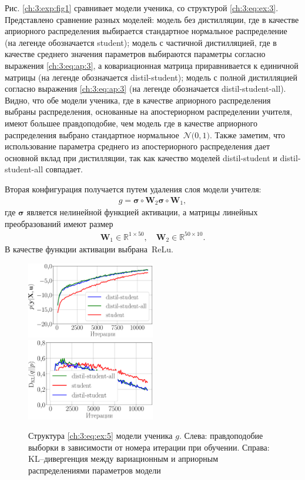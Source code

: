Рис. \ref{ch:3:exp:fig1} сравнивает модели ученика, со структурой \eqref{ch:3:eq:ex:3}. Представлено сравнение разных моделей: модель без дистилляции, где в качестве априорного распределения выбирается стандартное нормальное распределение (на легенде обозначается student); модель с частичной дистилляцией, где в качестве среднего значения параметров выбираются параметры согласно выражения \eqref{ch:3:eq:ap:3}, а ковариационная матрица приравнивается к единичной матрицы (на легенде обозначается distil-student); модель с полной дистилляцией согласно выражения \eqref{ch:3:eq:ap:3} (на легенде обозначается distil-student-all). Видно, что обе модели ученика, где в качестве априорного распределения выбраны распределения, основанные на апостериорном распределении учителя, имеют большее правдоподобие, чем модель где в качестве априорного распределения выбрано стандартное нормальное~$\mathcal{N}\bigr(0,1\bigr)$. Также заметим, что использование параметра среднего из апостериорного распределения дает основной вклад при дистилляции, так как качество моделей distil-student и distil-student-all совпадает.

Вторая конфигурация получается путем удаления слоя модели учителя:
\[
\label{ch:3:eq:ex:5}
\begin{aligned}
g = \bm{\sigma} \circ \mathbf{W}_2\bm{\sigma} \circ \mathbf{W}_1,
\end{aligned}
\]
где $\bm{\sigma}$ является нелинейной функцией активации, а матрицы линейных преобразований имеют размер
\[
\label{ch:3:eq:ex:6}
\begin{aligned}
\mathbf{W}_{1} \in \mathbb{R}^{1 \times 50}, \quad \mathbf{W}_{2} \in \mathbb{R}^{50 \times 10}.
\end{aligned}
\]
В качестве функции активации выбрана~$\text{ReLu}$.

\begin{figure}[h!]
\includegraphics[width=0.5\textwidth]{results/bayesdistil/synthetic_likelihood_2_layers.eps}
\includegraphics[width=0.5\textwidth]{results/bayesdistil/synthetic_D_KL_2_layers.eps}
\caption{Структура \eqref{ch:3:eq:ex:5} модели ученика $g$. Слева: правдоподобие выборки в зависимости от номера итерации при обучении. Справа: KL--дивергенция между вариационным и априорным распределениями параметров модели}
\label{ch:3:exp:fig2}
\end{figure}

